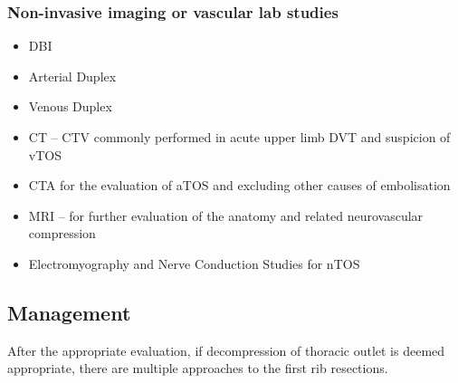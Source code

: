 \documentclass[
]{book}
\begin{document}
\hypertarget{non-invasive-imaging-or-vascular-lab-studies}{%
\subsubsection{Non-invasive imaging or vascular lab studies}\label{non-invasive-imaging-or-vascular-lab-studies}}

\begin{itemize}
\item
  DBI
\item
  Arterial Duplex
\item
  Venous Duplex
\item
  CT -- CTV commonly performed in acute upper limb DVT and suspicion
  of vTOS
\item
  CTA for the evaluation of aTOS and excluding other causes of
  embolisation
\item
  MRI -- for further evaluation of the anatomy and related
  neurovascular compression
\item
  Electromyography and Nerve Conduction Studies for nTOS
\end{itemize}

\hypertarget{management-10}{%
\subsection{Management}\label{management-10}}

After the appropriate evaluation, if decompression of thoracic outlet is
deemed appropriate, there are multiple approaches to the first rib
resections.
\end{document}
